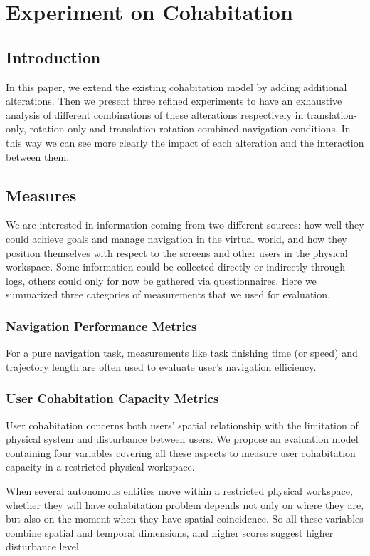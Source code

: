 \chapter{Experiment on Cohabitation}
\label{chapter:expe_cohab}
\minitoc

\section{Introduction}
In this paper, we extend the existing cohabitation model by adding additional alterations. Then we present three refined experiments to have an exhaustive analysis of different combinations of these alterations respectively in translation-only, rotation-only and translation-rotation combined navigation conditions. In this way we can see more clearly the impact of each alteration and the interaction between them.

\section{Measures}
We are interested in information coming from two different sources: how well they could achieve goals and manage navigation in the virtual world, and how they position themselves with respect to the screens and other users in the physical workspace. Some information could be collected directly or indirectly through logs, others could only for now be gathered via questionnaires. Here we summarized three categories of measurements that we used for evaluation.

\subsection{Navigation Performance Metrics}
For a pure navigation task, measurements like task finishing time (or speed) and trajectory length are often used to evaluate user's navigation efficiency.

\subsection{User Cohabitation Capacity Metrics}
User cohabitation concerns both users' spatial relationship with the limitation of physical system and disturbance between users. We propose an evaluation model containing four variables covering all these aspects to measure user cohabitation capacity in a restricted physical workspace.

When several autonomous entities move within a restricted physical workspace, whether they will have cohabitation problem depends not only on where they are, but also on the moment when they have spatial coincidence. So all these variables combine spatial and temporal dimensions, and higher scores suggest higher disturbance level.

